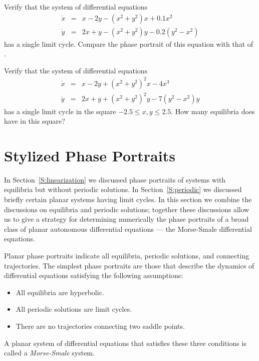 \documentclass{ximera}
\begin{document}
\CEXER

\begin{exercise} \label{c8.3.2}
Verify that the system of differential equations
\begin{equation*} \label{8.3.2eq} 
\begin{array}{rcl}
\dot{x} & = & x-2y -(x^2+y^2)x + 0.1x^2\\
\dot{y} & = & 2x+y - (x^2+y^2)y - 0.2(y^2-x^2)
\end{array}
\end{equation*}
has a single limit cycle.  Compare the phase portrait of this
equation with that of .
\end{exercise}

\begin{exercise} \label{c8.3.3}
Verify that the system of differential equations
\begin{equation*} \label{8.3.3eq} 
\begin{array}{rcl}
\dot{x} & = & x-2y + (x^2+y^2)^2x - 4x^3\\
\dot{y} & = & 2x+y + (x^2+y^2)^2y - 7(y^2-x^2)y
\end{array}
\end{equation*}
has a single limit cycle in the square $-2.5\leq x,y \leq 2.5$.  How many 
equilibria does  have in this square?  
\end{exercise}

\section{Stylized Phase Portraits}  \label{S:SPP}


In Section~\ref{S:linearization} we discussed phase portraits of systems with 
equilibria but without periodic solutions.  In Section~\ref{S:periodic} we 
discussed briefly certain planar systems having limit cycles.  In this 
section we combine the discussions on equilibria and periodic solutions; 
together these discussions allow us to give a strategy for determining 
numerically the phase portraits of a broad class of planar autonomous 
differential equations --- the Morse-Smale differential equations.
 
Planar phase portraits indicate all equilibria, periodic
solutions, and connecting trajectories.  The simplest phase
portraits are those that describe the dynamics of differential
equations satisfying the following assumptions: 
\begin{itemize}
\item	All equilibria are hyperbolic.
\item	All periodic solutions are limit cycles.
\item	There are no trajectories connecting two saddle points.
\end{itemize}
A planar system of differential equations that satisfies these
three conditions is called a {\em Morse-Smale\/} system.  
\end{document}
